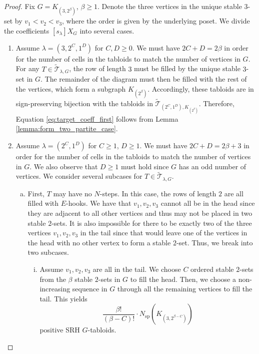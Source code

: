 \documentclass[12pt]{amsart}
\numberwithin{equation}{section}
\theoremstyle{plain}
\theoremstyle{definition}
\theoremstyle{remark}
\begin{document}
\begin{proof}
Fix $G=K_{(3,2^{\beta})}$, $\beta\ge 1$. Denote the three vertices in the unique stable $3$-set by $v_1< v_2< v_3$, where the order is given by the underlying poset. We divide the coefficients $
[s_{\lambda}]X_{G}$ into several cases.
\begin{enumerate}
    \item Assume $\lambda=(3,2^C,1^D)$ for $C,D\ge 0$. We must have $2C+D=2\beta$ in order for the number of cells in the tabloids to match the number of vertices in $G$. For any $T\in \tilde{\mathcal{T}}_{\lambda,G}$, the row of length $3$ must be filled by the unique stable $3$-set in $G$. The remainder of the diagram must then be filled with the rest of the vertices, which form a subgraph $K_{(2^{\beta})}$. Accordingly, these tabloids are in sign-preserving bijection with the tabloids in $\tilde{\mathcal{T}}_{(2^{C},1^D),K_{(2^{\beta})}}$. Therefore, Equation \ref{eq:target_coeff_first} follows from Lemma \ref{lemma:form_two_partite_case}.


    \item Assume $\lambda=(2^C,1^D)$ for $C\ge 1$, $D\ge 1$. We must have $2C+D=2\beta+3$ in order for the number of cells in the tabloids to match the number of vertices in $G$. We also observe that $D\ge 1$ must hold since $G$ has an odd number of vertices. We consider several subcases for $T\in\tilde{\mathcal{T}}_{\lambda,G}$. 
    \begin{enumerate}[(a)]
    \item First, $T$ may have no $N$-steps. In this case, the rows of length $2$ are all filled with $E$-hooks. We have that $v_1,v_2,v_3$ cannot all be in the head since they are adjacent to all other vertices and thus may not be placed in two stable $2$-sets. It is also impossible for there to be exactly two of the three vertices $v_1,v_2,v_3$ in the tail since that would leave one of the vertices in the head with no other vertex to form a stable $2$-set. Thus, we break into two subcases.
    \begin{enumerate}[(i)]
        \item Assume $v_1,v_2,v_3$ are all in the tail. We choose $C$ ordered stable $2$-sets from the $\beta$ stable $2$-sets in $G$ to fill the head. Then, we choose a non-increasing sequence in $G$ through all the remaining vertices to fill the tail. This yields
        \[
        \frac{\beta !}{(\beta-C)!}\cdot N_{\mathrm{sp}}(K_{(3,2^{\beta-C})})
        \]
        positive SRH $G$-tabloids. 



\end{enumerate}
\end{enumerate}
\end{enumerate}
\end{proof}
\end{document}
